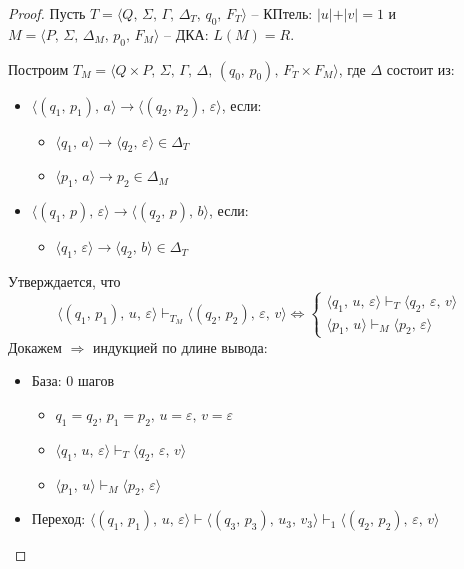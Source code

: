 \documentclass[a4paper,12pt]{article}
\theoremstyle{plain}
\theoremstyle{definition}
\theoremstyle{remark}
\begin{document}
\begin{proof}
	Пусть $T = \langle Q,\,\Sigma,\,\Gamma,\,\Delta_T,\, q_0,\, F_T\rangle$ -- КПтель: $\vert u\vert+\vert v\vert=1$ и $M = \langle P,\, \Sigma,\, \Delta_M,\, p_0,\, F_M\rangle$ -- ДКА: $L(M) = R$.

	Построим $T_M = \langle Q\times P,\, \Sigma,\, \Gamma,\, \Delta,\, (q_0,\, p_0),\, F_T\times F_M\rangle$, где $\Delta$ состоит из:
	\begin{itemize}
		\item $\langle(q_1,\,p_1),\, a\rangle\to\langle(q_2,\,p_2),\,\varepsilon\rangle$, если:
		      \begin{itemize}
			      \item $\langle q_1,\,a\rangle\to\langle q_2,\,\varepsilon\rangle\in\Delta_T$
			      \item $\langle p_1,\,a\rangle\to p_2 \in \Delta_M$
		      \end{itemize}
		\item $\langle(q_1,\,p),\,\varepsilon\rangle\to\langle(q_2,\,p),\,b\rangle$, если:
		      \begin{itemize}
			      \item $\langle q_1,\,\varepsilon\rangle\to\langle q_2,\,b\rangle\in\Delta_T$
		      \end{itemize}
	\end{itemize}
	Утверждается, что
	\[
		\langle(q_1,\,p_1),\,u,\,\varepsilon\rangle\vdash_{T_M}\langle (q_2,\,p_2),\,\varepsilon,\,v\rangle \Leftrightarrow\begin{cases}
			\langle q_1,\,u,\,\varepsilon\rangle\vdash_T\langle q_2,\,\varepsilon,\,v\rangle \\
			\langle p_1,\,u\rangle\vdash_M\langle p_2,\,\varepsilon\rangle
		\end{cases}
	\]
	Докажем $\Rightarrow$ индукцией по длине вывода:
	\begin{itemize}
		\item База: 0 шагов
		      \begin{itemize}
			      \item $q_1 = q_2,\, p_1 = p_2,\, u = \varepsilon,\, v = \varepsilon$
			      \item $\langle q_1,\,u,\,\varepsilon\rangle\vdash_T\langle q_2,\,\varepsilon,\,v\rangle$
			      \item $\langle p_1,\,u\rangle\vdash_M\langle p_2,\,\varepsilon\rangle$
		      \end{itemize}
		\item Переход: $\langle(q_1,\,p_1),\,u,\,\varepsilon\rangle\vdash\langle(q_3,\,p_3),\,u_3,\,v_3\rangle\vdash_1\langle(q_2,\,p_2),\,\varepsilon,\,v\rangle$

\end{itemize}
\end{proof}
\end{document}
